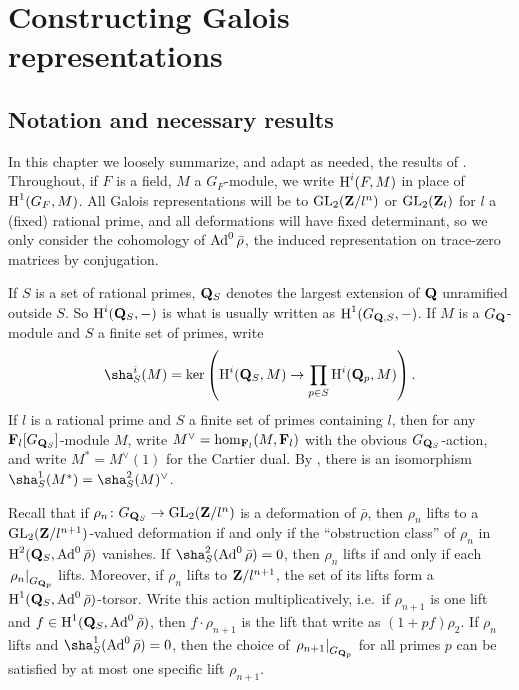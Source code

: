
\chapter{Constructing Galois representations}





\section{Notation and necessary results}

In this chapter we loosely summarize, and adapt as needed, the results of 
\cite{khare-larsen-ramakrishna-2005,pande-2011}. Throughout, if $F$ is a field, 
$M$ a $G_F$-module, we write $\operatorname{H}^i(F,M)$ in place of $\operatorname{H}^1(G_F,M)$. All Galois 
representations will be to $\operatorname{GL}_2(\mathbf{Z}/l^n)$ or $\operatorname{GL}_2(\mathbf{Z}_l)$ for $l$ a (fixed) 
rational prime, and all deformations will have fixed determinant, so we only 
consider the cohomology of $\operatorname{Ad}^0\bar\rho$, the induced representation on 
trace-zero matrices by conjugation. 

If $S$ is a set of rational primes, $\mathbf{Q}_S$ denotes the largest extension of 
$\mathbf{Q}$ unramified outside $S$. So $\operatorname{H}^i(\mathbf{Q}_S,-)$ is what is usually written as 
$\operatorname{H}^1(G_{\mathbf{Q},S},-)$. If $M$ is a $G_{\mathbf{Q}}$-module and $S$ a finite set of primes, 
write 
\[
	\sha^i_S(M) = \ker\left( \h^i(\bQ_S,M) \to \prod_{p\in S} \h^i(\bQ_p,M)\right) .
\]
If $l$ is a rational prime and $S$ a finite set of primes containing $l$, then 
for any $\mathbf{F}_l[G_{\mathbf{Q}_S}]$-module $M$, write $M^\vee=\hom_{\mathbf{F}_l}(M,\mathbf{F}_l)$ 
with the obvious $G_{\mathbf{Q}_S}$-action, and write $M^\ast = M^\vee(1)$ for the 
Cartier dual. By \cite[Th.~8.6.7]{neukirch-schmidt-winberg-2008}, there is an 
isomorphism $\sha^1_S(M^\ast) = \sha_S^2(M)^\vee$. 

Recall that if $\rho_n\colon G_{\mathbf{Q}_S} \to \operatorname{GL}_2(\mathbf{Z}/l^n)$ is a deformation of 
$\bar\rho$, then $\rho_n$ lifts to a $\operatorname{GL}_2(\mathbf{Z}/l^{n+1})$-valued deformation if 
and only if the ``obstruction class'' of $\rho_n$ in 
$\operatorname{H}^2(\mathbf{Q}_S,\operatorname{Ad}^0\bar\rho)$ vanishes. If $\sha_S^2(\Ad^0\bar\rho) = 0$, then 
$\rho_n$ lifts if and only if each $\left.\rho_n\right|_{G_{\mathbf{Q}_p}}$ lifts. 
Moreover, if $\rho_n$ lifts to $\mathbf{Z}/l^{n+1}$, the set of its lifts form a 
$\operatorname{H}^1(\mathbf{Q}_S,\operatorname{Ad}^0\bar\rho)$-torsor. Write this action multiplicatively, i.e.~if 
$\rho_{n+1}$ is one lift and $f\in \operatorname{H}^1(\mathbf{Q}_S,\operatorname{Ad}^0\bar\rho)$, then 
$f\cdot \rho_{n+1}$ is the lift that \cite{khare-larsen-ramakrishna-2005} write 
as $(1+p f)\rho_2$. If $\rho_n$ lifts and $\sha_S^1(\Ad^0\bar\rho) = 0$, then 
the choice of $\left. \rho_{n+1}\right|_{G_{\mathbf{Q}_p}}$ for all primes $p$ can be 
satisfied by at most one specific lift $\rho_{n+1}$. 

